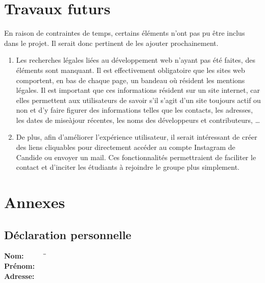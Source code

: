 \documentclass[a4,10pt,french]{sphinxmanual}
\begin{document}
\chapter{Travaux futurs}
\label{\detokenize{chapitre-05:travaux-futurs}}\label{\detokenize{chapitre-05::doc}}
\sphinxAtStartPar
En raison de contraintes de temps, certains éléments n’ont pas pu être inclus dans le projet. Il serait donc pertinent de les ajouter prochainement.
\begin{enumerate}
%
\item {} 
\sphinxAtStartPar
Les recherches légales liées au développement web n’ayant pas été faites, des éléments sont manquant. Il est effectivement obligatoire que les sites web comportent, en bas de chaque page, un bandeau où résident les mentions légales. Il est important que ces informations résident sur un site internet, car elles permettent aux utilisateurs de savoir s’il s’agit d’un site toujours actif ou non et d’y faire figurer des informations telles que les contacts, les adresses, les dates de mise\sphinxhyphen{}à\sphinxhyphen{}jour récentes, les noms des développeurs et contributeurs, …

\item {} 
\sphinxAtStartPar
De plus, afin d’améliorer l’expérience utilisateur, il serait intéressant de créer des liens cliquables pour directement accéder au compte Instagram de Candide ou envoyer un mail. Ces fonctionnalités permettraient de faciliter le contact et d’inciter les étudiants à rejoindre le groupe plus simplement.

\end{enumerate}

\appendix



\chapter{Annexes}
\label{\detokenize{chapitre-06:annexes}}\label{\detokenize{chapitre-06::doc}}

\section{Déclaration personnelle}
\label{\detokenize{chapitre-06:declaration-personnelle}}
{

\large
\begin{tabbing}
\textbf{Nom:} ~~~~~ \=  \= \studentlastname \\
\textbf{Prénom:}~~~ \>  \> \studentfirstname \\
\textbf{Adresse:}~~ \>  \> \studentaddress
\end{tabbing} 
}
\end{document}
